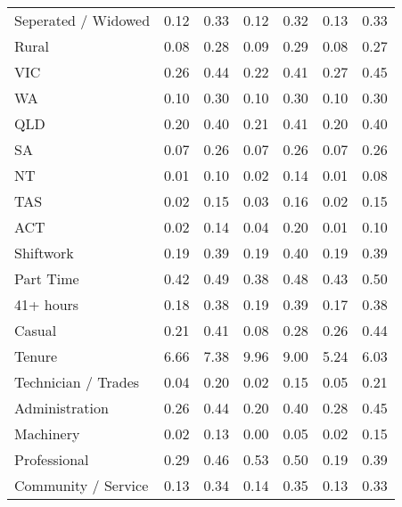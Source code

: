 {\begin{tabular}{l*{3}{cc}}
Seperated / Widowed &        0.12&        0.33&        0.12&        0.32&        0.13&        0.33\\
Rural               &        0.08&        0.28&        0.09&        0.29&        0.08&        0.27\\
VIC                 &        0.26&        0.44&        0.22&        0.41&        0.27&        0.45\\
WA                  &        0.10&        0.30&        0.10&        0.30&        0.10&        0.30\\
QLD                 &        0.20&        0.40&        0.21&        0.41&        0.20&        0.40\\
SA                  &        0.07&        0.26&        0.07&        0.26&        0.07&        0.26\\
NT                  &        0.01&        0.10&        0.02&        0.14&        0.01&        0.08\\
TAS                 &        0.02&        0.15&        0.03&        0.16&        0.02&        0.15\\
ACT                 &        0.02&        0.14&        0.04&        0.20&        0.01&        0.10\\
Shiftwork           &        0.19&        0.39&        0.19&        0.40&        0.19&        0.39\\
Part Time           &        0.42&        0.49&        0.38&        0.48&        0.43&        0.50\\
41+ hours           &        0.18&        0.38&        0.19&        0.39&        0.17&        0.38\\
Casual              &        0.21&        0.41&        0.08&        0.28&        0.26&        0.44\\
Tenure              &        6.66&        7.38&        9.96&        9.00&        5.24&        6.03\\
Technician / Trades &        0.04&        0.20&        0.02&        0.15&        0.05&        0.21\\
Administration      &        0.26&        0.44&        0.20&        0.40&        0.28&        0.45\\
Machinery           &        0.02&        0.13&        0.00&        0.05&        0.02&        0.15\\
Professional        &        0.29&        0.46&        0.53&        0.50&        0.19&        0.39\\
Community / Service &        0.13&        0.34&        0.14&        0.35&        0.13&        0.33\\

\end{tabular}}
